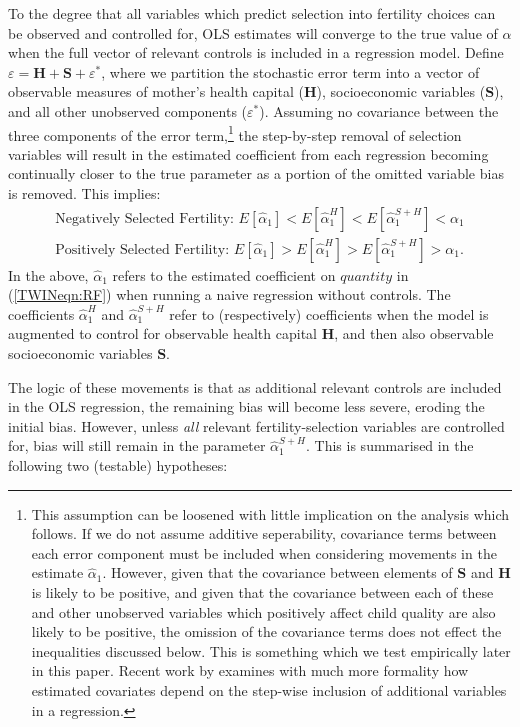 \documentclass[subeqn]{article}
\begin{document}
\begin{spacing}{1.4}
To the degree that all variables which predict selection into fertility choices
can be observed and controlled for, OLS estimates will converge to the true value
of $\alpha$ when the full vector of relevant controls is included in a regression
model.  Define $\varepsilon=\bm{H}+\bm{S}+\varepsilon^*$, where we partition the
stochastic error term into a vector of observable measures of mother's health
capital ($\bm{H}$), socioeconomic variables ($\bm{S}$), and all other unobserved components
($\varepsilon^*$).  Assuming no covariance between the three components of the
error term,\footnote{This assumption can be loosened with little implication on the
  analysis which follows.  If we do not assume additive seperability, covariance
  terms between each error component must be included when considering movements in
  the estimate $\hat\alpha_1$.  However, given that the covariance between elements
  of $\bm{S}$ and $\bm{H}$ is likely to be positive, and given that the covariance
  between each of these and other unobserved variables which positively affect
  child quality are also likely to be positive, the omission of the covariance
  terms does not effect the inequalities discussed below.  This is something which
  we test empirically later in this paper.  Recent work by \citet{Gelbach2016}
  examines with much more formality how estimated covariates depend on the step-wise
  inclusion of additional variables in a regression.} the step-by-step removal of
selection variables will result in the estimated coefficient from each regression
becoming continually closer to the true parameter as a portion of the omitted
variable bias is removed.  This implies:
\begin{eqnarray}
  \text{Negatively Selected Fertility:\ \ \ } E[\hat\alpha_1] < E[\hat\alpha_1^{H}] < E[\hat\alpha_1^{S+H}] < \alpha_1 \nonumber \\
  \text{Positively Selected Fertility:\ \ \ } E[\hat\alpha_1] > E[\hat\alpha_1^{H}] > E[\hat\alpha_1^{S+H}] > \alpha_1. \nonumber
\end{eqnarray}
In the above, $\hat\alpha_1$ refers to the estimated coefficient on
$quantity$ in (\ref{TWINeqn:RF}) when running a naive regression without
controls.  The coefficients $\hat\alpha_1^H$ and $\hat\alpha_1^{S+H}$
refer to (respectively) coefficients when the model is augmented to
control for observable health capital $\bm{H}$, and then also observable
socioeconomic variables $\bm{S}$.

The logic of these movements is that as additional relevant controls
are included in the OLS regression, the remaining bias will become
less severe, eroding the initial bias.  However, unless \emph{all} relevant
fertility-selection variables are controlled for, bias will still remain in
the parameter $\hat\alpha_1^{S+H}$.  This is summarised in the following two
(testable) hypotheses:


\end{spacing}
\end{document}
